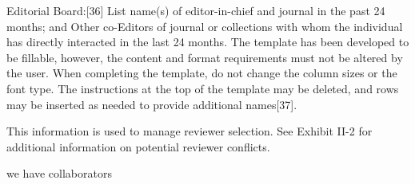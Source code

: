{Editorial Board:[36] List name(s) of editor-in-chief and journal in the past 24 months; and
Other co-Editors of journal or collections with whom the individual has directly interacted in the last 24 months.
The template has been developed to be fillable, however, the content and format requirements must not be altered by the user. When completing the template, do not change the column sizes or the font type. The instructions at the top of the template may be deleted, and rows may be inserted as needed to provide additional names[37].

This information is used to manage reviewer selection. See Exhibit II-2 for additional information on potential reviewer conflicts.


}

we have collaborators
